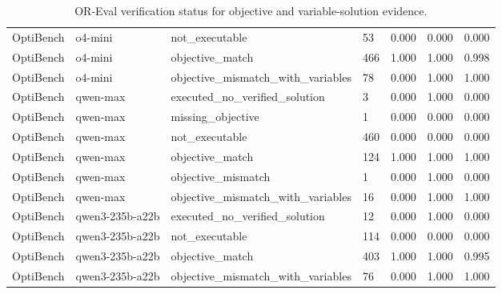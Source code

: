 \begin{table}[t]
\begin{tabular}{lllllll}
OptiBench & o4-mini & not\_executable & 53 & 0.000 & 0.000 & 0.000 \\
OptiBench & o4-mini & objective\_match & 466 & 1.000 & 1.000 & 0.998 \\
OptiBench & o4-mini & objective\_mismatch\_with\_variables & 78 & 0.000 & 1.000 & 1.000 \\
OptiBench & qwen-max & executed\_no\_verified\_solution & 3 & 0.000 & 1.000 & 0.000 \\
OptiBench & qwen-max & missing\_objective & 1 & 0.000 & 0.000 & 0.000 \\
OptiBench & qwen-max & not\_executable & 460 & 0.000 & 0.000 & 0.000 \\
OptiBench & qwen-max & objective\_match & 124 & 1.000 & 1.000 & 1.000 \\
OptiBench & qwen-max & objective\_mismatch & 1 & 0.000 & 1.000 & 0.000 \\
OptiBench & qwen-max & objective\_mismatch\_with\_variables & 16 & 0.000 & 1.000 & 1.000 \\
OptiBench & qwen3-235b-a22b & executed\_no\_verified\_solution & 12 & 0.000 & 1.000 & 0.000 \\
OptiBench & qwen3-235b-a22b & not\_executable & 114 & 0.000 & 0.000 & 0.000 \\
OptiBench & qwen3-235b-a22b & objective\_match & 403 & 1.000 & 1.000 & 0.995 \\
OptiBench & qwen3-235b-a22b & objective\_mismatch\_with\_variables & 76 & 0.000 & 1.000 & 1.000 \\
\bottomrule
\end{tabular}
\caption{OR-Eval verification status for objective and variable-solution evidence.}
\label{tab:or_eval_verification_status}
\end{table}

